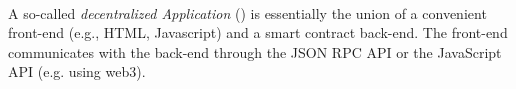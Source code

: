 \paragraph{\dapp}
\label{sec:dapp}
A so-called \emph{decentralized Application} (\dapp) is essentially the union of
a convenient front-end (e.g., HTML, Javascript) and a smart contract back-end.
The front-end communicates with the back-end through the JSON RPC API or the
JavaScript API (e.g. using web3).

 
